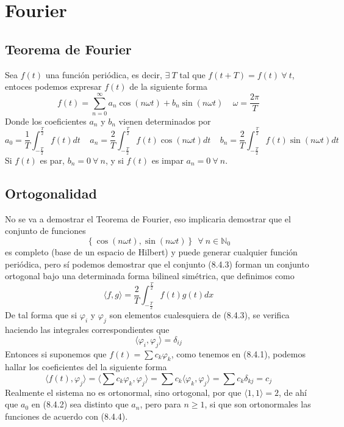 \section{Fourier}
\subsection{Teorema de Fourier}
Sea $f(t)$ una función periódica, es decir, $\exists \ T$ tal que $f(t+T) = f(t) \ \forall \ t$, entoces podemos expresar $f(t)$ de la siguiente forma
\begin{equation} \label{6.1.1}
    f(t) = \sum_{n=0}^\infty a_n \cos (n\omega t) + b_n \sin (n\omega t) \ \ \ \ \ \omega = \frac{2\pi}{T}
\end{equation}
Donde los coeficientes $a_n$ y $b_n$ vienen determinados por 
\begin{equation} \label{6.1.1}
    a_0 = \frac{1}{T}\int_{-\frac{T}{2}}^{\frac{T}{2}} f(t)dt \ \ \ \ \ a_n = \frac{2}{T}\int_{-\frac{T}{2}}^{\frac{T}{2}} f(t)\cos(n\omega t)dt \ \ \ \ \ b_n = \frac{2}{T}\int_{-\frac{T}{2}}^{\frac{T}{2}} f(t)\sin(n\omega t)dt
\end{equation}
Si $f(t)$ es par, $b_n =0 \ \forall \ n$, y si $f(t)$ es impar $a_n =0 \ \forall \ n$.
\subsection{Ortogonalidad}
No se va a demostrar el Teorema de Fourier, eso implicaria demostrar que el conjunto de funciones
\begin{equation} \label{6.1.1}
    \left\{\cos(n\omega t),\sin(n\omega t)\right\} \ \ \forall \ n \in \mathbb{N}_0
\end{equation}
es completo (base de un espacio de Hilbert) y puede generar cualquier función periódica, pero sí podemos demostrar que el conjunto (8.4.3) forman un conjunto ortogonal bajo una determinada forma bilineal simétrica, que definimos como
\begin{equation} \label{6.1.1}
    \langle f,g \rangle = \frac{2}{T}\int_{-\frac{T}{2}}^{\frac{T}{2}} f(t) g(t) dx
\end{equation}
De tal forma que si $\varphi_i$ y $\varphi_j$ son elementos cualesquiera de (8.4.3), se verifica haciendo las integrales correspondientes que 
\begin{equation} \label{6.1.1}
    \langle \varphi_i, \varphi_j \rangle = \delta_{ij}
\end{equation}
Entonces si suponemos que $f(t) = \sum c_k \varphi_k$, como tenemos en (8.4.1), podemos hallar los coeficientes del la siguiente forma
\begin{equation} \label{6.1.1}
    \langle f(t), \varphi_j \rangle =\langle \sum c_k \varphi_k, \varphi_j \rangle =  \sum c_k \langle \varphi_k, \varphi_j \rangle= \sum c_k \delta_{kj} = c_j
\end{equation}
Realmente el sistema no es ortonormal, sino ortogonal, por que $\langle 1,1\rangle = 2$, de ahí que $a_0$ en (8.4.2) sea distinto que $a_n$, pero para $n\geq 1$, si que son ortonormales las funciones de acuerdo con (8.4.4).
